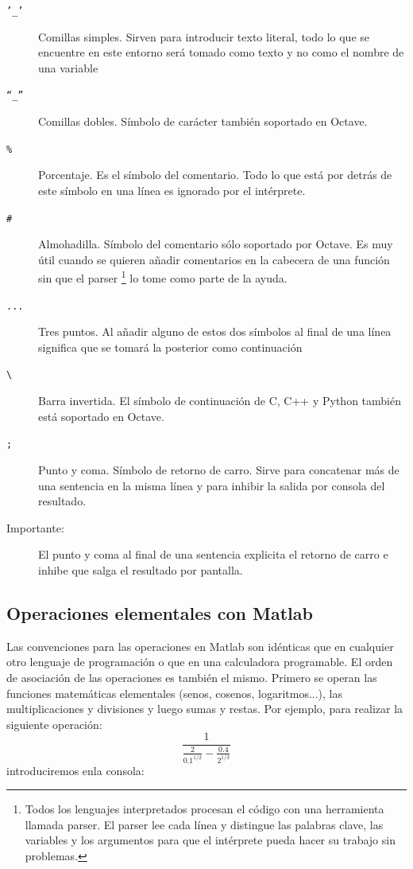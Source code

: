 \begin{description}
\item [\texttt{'\_'}]Comillas simples. Sirven para introducir texto
  literal, todo lo que se encuentre en este entorno será tomado como
  texto y no como el nombre de una variable
\item [\texttt{{}``\_''}]Comillas dobles. Símbolo de carácter también
  soportado en Octave.
\item [\texttt{\%}]Porcentaje. Es el símbolo del comentario. Todo lo
  que está por detrás de este símbolo en una línea es ignorado por el
  intérprete.
\item [\texttt{\#}]Almohadilla. Símbolo del comentario sólo soportado
  por Octave. Es muy útil cuando se quieren añadir comentarios en la
  cabecera de una función sin que el parser%
  \footnote{Todos los lenguajes interpretados procesan el código con
    una herramienta llamada parser. El parser lee cada línea y
    distingue las palabras clave, las variables y los argumentos para
    que el intérprete pueda hacer su trabajo sin problemas.%
  } lo tome como parte de la ayuda.
\item [\texttt{...}]Tres puntos. Al añadir alguno de estos dos
  símbolos al final de una línea significa que se tomará la posterior
  como continuación
\item [\texttt{\textbackslash{}}]Barra invertida. El símbolo de
  continuación de C, C++ y Python también está soportado en Octave.
\item [\texttt{;}]Punto y coma. Símbolo de retorno de carro. Sirve
  para concatenar más de una sentencia en la misma línea y para
  inhibir la salida por consola del resultado.
\item [Importante:]El punto y coma al final de una sentencia explicita
  el retorno de carro e inhibe que salga el resultado por pantalla.
\end{description}

\subsection{Operaciones elementales con Matlab}

Las convenciones para las operaciones en Matlab son idénticas que en
cualquier otro lenguaje de programación o que en una calculadora
programable. El orden de asociación de las operaciones es también el
mismo. Primero se operan las funciones matemáticas elementales (senos,
cosenos, logaritmos...), las multiplicaciones y divisiones y luego
sumas y restas. Por ejemplo, para realizar la siguiente operación:
$$\frac{1}{\frac{2}{0.1^{1/2}}-\frac{0.4}{2^{1/3}}}$$
introduciremos enla consola:

